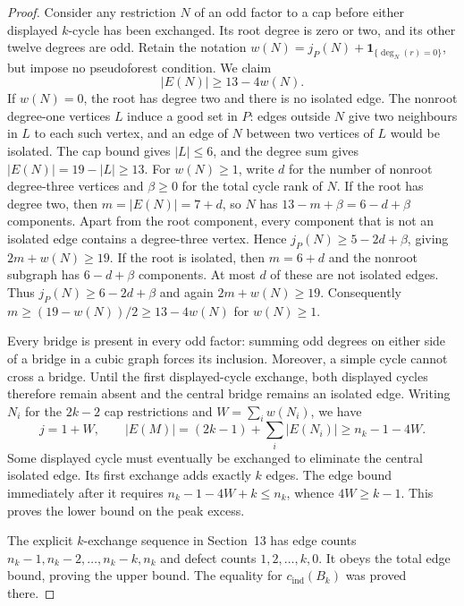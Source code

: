 \documentclass[11pt]{article}
\newcommand{\cind}{c_{\mathrm{ind}}}
\begin{document}
\begin{proof}
Consider any restriction $N$ of an odd factor to a cap before either
displayed $k$-cycle has been exchanged. Its root degree is zero or two,
and its other twelve degrees are odd. Retain the notation
$w(N)=j_P(N)+\mathbf1_{\{\deg_N(r)=0\}}$, but impose no
pseudoforest condition. We claim
\begin{equation}\label{eq:cap-budget}
 |E(N)|\geq13-4w(N).
\end{equation}
If $w(N)=0$, the root has degree two and there is no isolated edge.
The nonroot degree-one vertices $L$ induce a good set in $P$:
edges outside $N$ give two neighbours in $L$ to each such vertex,
and an edge of $N$ between two vertices of $L$ would be isolated.
The cap bound gives $|L|\leq6$, and the degree sum gives
$|E(N)|=19-|L|\geq13$. For $w(N)\geq1$, write $d$ for the number of nonroot degree-three
vertices and $\beta\geq0$ for the total cycle rank of $N$.
If the root has degree two, then $m=|E(N)|=7+d$, so $N$ has
$13-m+\beta=6-d+\beta$ components. Apart from the root component,
every component that is not an isolated edge contains a degree-three
vertex. Hence $j_P(N)\geq5-2d+\beta$, giving $2m+w(N)\geq19$.
If the root is isolated, then $m=6+d$ and the nonroot subgraph has
$6-d+\beta$ components. At most $d$ of these are not isolated
edges. Thus $j_P(N)\geq6-2d+\beta$ and again $2m+w(N)\geq19$.
Consequently $m\geq(19-w(N))/2\geq13-4w(N)$ for $w(N)\geq1$.

Every bridge is present in every odd factor: summing odd degrees on
either side of a bridge in a cubic graph forces its inclusion.
Moreover, a simple cycle cannot cross a bridge. Until the first
displayed-cycle exchange, both displayed cycles therefore remain
absent and the central bridge remains an isolated edge. Writing $N_i$
for the $2k-2$ cap restrictions and $W=\sum_iw(N_i)$, we have
\[
 j=1+W,\qquad
 |E(M)|=(2k-1)+\sum_i|E(N_i)|\geq n_k-1-4W.
\]
Some displayed cycle must eventually be exchanged to eliminate the
central isolated edge. Its first exchange adds exactly $k$ edges.
The edge bound immediately after it requires
$n_k-1-4W+k\leq n_k$, whence $4W\geq k-1$.
This proves the lower bound on the peak excess.

The explicit $k$-exchange sequence in Section~13 has edge counts
$n_k-1,n_k-2,\ldots,n_k-k,n_k$ and defect counts
$1,2,\ldots,k,0$. It obeys the total edge bound, proving the
upper bound. The equality for $\cind(B_k)$ was proved there.
\end{proof}
\end{document}
